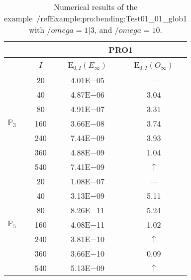 \begin{table}[H]
\caption{Numerical results of the example~/ref{Example:pro:bending:Test01_01_glob1} with $/omega=1|3$, and $/omega=10$.}
\setlength{\tabcolsep}{5pt}
\centering
\begin{tabular}{@{}l c c c@{}}
\toprule
 &  & \multicolumn{2}{c}{PRO1}\\
\midrule
 & $I$ & E$_{0,I}(E_{\infty})$ & E$_{0,I}(O_{\infty})$\\
\midrule
\multirow{7}{*}{$\mathbb{P}_{3}$}
 & 20 & 4.01E$-$05 & ---\\
 & 40 & 4.87E$-$06 & 3.04\\
 & 80 & 4.91E$-$07 & 3.31\\
 & 160 & 3.66E$-$08 & 3.74\\
 & 240 & 7.44E$-$09 & 3.93\\
 & 360 & 4.88E$-$09 & 1.04\\
 & 540 & 7.41E$-$09 & $\uparrow$\\
\midrule
\multirow{7}{*}{$\mathbb{P}_{5}$}
 & 20 & 1.08E$-$07 & ---\\
 & 40 & 3.13E$-$09 & 5.11\\
 & 80 & 8.26E$-$11 & 5.24\\
 & 160 & 4.08E$-$11 & 1.02\\
 & 240 & 3.81E$-$10 & $\uparrow$\\
 & 360 & 3.66E$-$10 & 0.09\\
 & 540 & 5.13E$-$09 & $\uparrow$\\
\bottomrule
\end{tabular}
\label{Table:pRO:test_01_01_test4_pro3}
\end{table}
